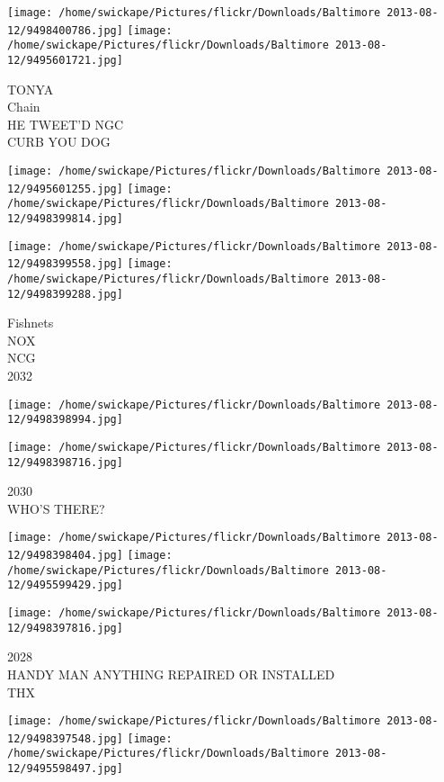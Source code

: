 \documentclass[10pt,letterpaper]{article}
\begin{document}
\texttt{[image: /home/swickape/Pictures/flickr/Downloads/Baltimore 2013-08-12/9498400786.jpg]}
\texttt{[image: /home/swickape/Pictures/flickr/Downloads/Baltimore 2013-08-12/9495601721.jpg]}

TONYA\\
Chain\\
HE TWEET'D NGC\\
CURB YOU DOG
\pagebreak

\texttt{[image: /home/swickape/Pictures/flickr/Downloads/Baltimore 2013-08-12/9495601255.jpg]}
\texttt{[image: /home/swickape/Pictures/flickr/Downloads/Baltimore 2013-08-12/9498399814.jpg]}

\texttt{[image: /home/swickape/Pictures/flickr/Downloads/Baltimore 2013-08-12/9498399558.jpg]}
\texttt{[image: /home/swickape/Pictures/flickr/Downloads/Baltimore 2013-08-12/9498399288.jpg]}

Fishnets\\
NOX\\
NCG\\
2032
\pagebreak

\texttt{[image: /home/swickape/Pictures/flickr/Downloads/Baltimore 2013-08-12/9498398994.jpg]}

\vspace{0.25in}
\texttt{[image: /home/swickape/Pictures/flickr/Downloads/Baltimore 2013-08-12/9498398716.jpg]}

2030\\
WHO'S THERE?
\pagebreak

\texttt{[image: /home/swickape/Pictures/flickr/Downloads/Baltimore 2013-08-12/9498398404.jpg]}
\texttt{[image: /home/swickape/Pictures/flickr/Downloads/Baltimore 2013-08-12/9495599429.jpg]}

\vspace{0.25in}
\texttt{[image: /home/swickape/Pictures/flickr/Downloads/Baltimore 2013-08-12/9498397816.jpg]}

2028\\
HANDY MAN ANYTHING REPAIRED OR INSTALLED\\
THX
\pagebreak

\texttt{[image: /home/swickape/Pictures/flickr/Downloads/Baltimore 2013-08-12/9498397548.jpg]}
\texttt{[image: /home/swickape/Pictures/flickr/Downloads/Baltimore 2013-08-12/9495598497.jpg]}
\end{document}
